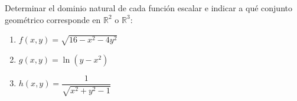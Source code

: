 Determinar el dominio natural de cada función escalar e indicar a qué conjunto geométrico corresponde en $\mathbb{R}^2$ o $\mathbb{R}^3$:
\begin{enumerate}
    \item $f(x,y) = \sqrt{16 - x^2 - 4y^2}$
    \item $g(x,y) = \ln(y - x^2)$
    \item $h(x,y) = \dfrac{1}{\sqrt{x^2 + y^2 - 1}}$
\end{enumerate}